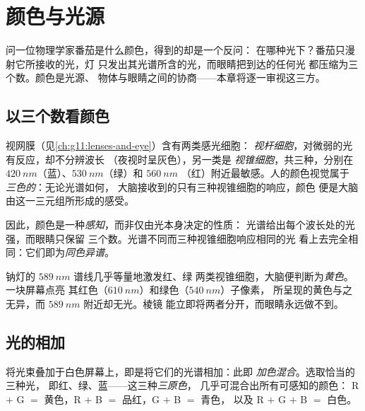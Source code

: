 \chapter{颜色与光源}\label{ch:g11:color-light-sources}

问一位物理学家番茄是什么颜色，得到的却是一个反问：
在哪种光下？番茄只漫射它所接收的光，灯
只发出其光谱所含的光，而眼睛把到达的任何光
都压缩为三个数。颜色是光源、
物体与眼睛之间的协商——本章将逐一审视这三方。

\section{以三个数看颜色}

\begin{definition}[视锥细胞与三色视觉]\label{def:g11:color-light-sources:cones}
视网膜（见\cref{ch:g11:lenses-and-eye}）含有两类感光细胞：
\emph{视杆细胞}，对微弱的光有反应，却不分辨波长
（夜视时呈灰色），另一类是
\emph{视锥细胞}，共三种，分别在
$\qty{420}{nm}$（蓝）、$\qty{530}{nm}$（绿）和 $\qty{560}{nm}$
（红）附近最敏感。人的颜色视觉属于
\emph{三色的}：无论光谱如何，
大脑接收到的只有三种视锥细胞的响应，颜色
便是大脑由这一三元组所形成的感受。
\end{definition}

\begin{definition}[颜色即感知]\label{def:g11:color-light-sources:perception}
因此，颜色是一种\emph{感知}，而非仅由光本身决定的性质：
光谱给出每个波长处的光强，而眼睛只保留
三个数。光谱不同而三种视锥细胞响应相同的光
看上去完全相同：它们即为\emph{同色异谱}。
\end{definition}

\begin{example}[两种黄色]\label{ex:g11:color-light-sources:yellows}
钠灯的 $\qty{589}{nm}$ 谱线几乎等量地激发红、绿
两类视锥细胞，大脑便判断为\emph{黄色}。一块屏幕点亮
其红色（$\qty{610}{nm}$）和绿色（$\qty{540}{nm}$）子像素，
所呈现的黄色与之无异，而 $\qty{589}{nm}$ 附近却无光。棱镜
能立即将两者分开，而眼睛永远做不到。
\end{example}

\section{光的相加}

\begin{definition}[加色混合]\label{def:g11:color-light-sources:additive}
将光束叠加于白色屏幕上，即是将它们的光谱相加：此即
\emph{加色混合}。选取恰当的三种光，
即红、绿、蓝——这三种\emph{三原色}，
几乎可混合出所有可感知的颜色：
R $+$ G $=$ 黄色，R $+$ B $=$ 品红，G $+$ B $=$ 青色，
以及 R $+$ G $+$ B $=$ 白色。
\end{definition}

